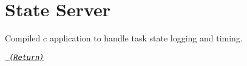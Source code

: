\chapter{State Server}
\hypertarget{index}{}\label{index}
\label{index_md__r_e_a_d_m_e}%
%
 Compiled {\ttfamily c} application to handle task state logging and timing. ~\newline


{\itshape \href{https://code.nml.wtf/docs}{\texttt{ (Return)}}}

 
